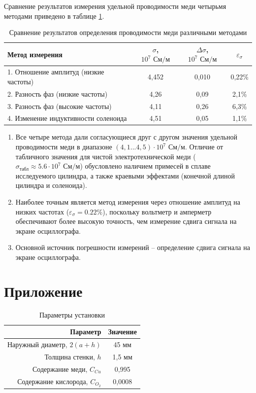 \documentclass[12pt]{extarticle}
\begin{document}
	\hspace{4mm} Сравнение результатов измерения удельной проводимости меди четырьмя методами приведено в таблице \ref{tab:summary}.
	\begin{table}[H]
		\centering
		\caption{Сравнение результатов определения проводимости меди различными методами}
		\label{tab:summary}
		\begin{tabular}{lccc}
			\toprule
			Метод измерения & $\sigma$, $10^7\text{ См/м}$ & $\Delta\sigma$, $10^7\text{ См/м}$ & $\varepsilon_\sigma$ \\
			\midrule
			1. Отношение амплитуд (низкие частоты) & 4,452 & 0,010 & 0,22\% \\
			2. Разность фаз (низкие частоты)       & 4,26  & 0,09  & 2,1\%  \\
			3. Разность фаз (высокие частоты)      & 4,11  & 0,26  & 6,3\%  \\
			4. Изменение индуктивности соленоида   & 4,51  & 0,05  & 1,1\%  \\
			\bottomrule
		\end{tabular}
	\end{table}
	
	\begin{enumerate}
		\item Все четыре метода дали согласующиеся друг с другом значения удельной проводимости меди в диапазоне $(4,1...4,5)\cdot 10^7\text{ См/м}$. Отличие от табличного значения для чистой электротехнической меди ($\sigma_{\text{табл}} \approx 5.6\cdot 10^7\text{ См/м}$) обусловлено наличием примесей в сплаве исследуемого цилиндра, а также краевыми эффектами (конечной длиной цилиндра и соленоида).
		\item Наиболее точным является метод измерения через отношение амплитуд на низких частотах ($\varepsilon_\sigma = 0.22\%$), поскольку вольтметр и амперметр обеспечивают более высокую точность, чем измерение сдвига сигнала на экране осциллографа.
		\item Основной источник погрешности измерений -- определение сдвига сигнала на экране осциллографа.
	\end{enumerate}
	
	
\newpage
\section{Приложение}

	\begin{table}[h!]
		\caption{Параметры установки}
		\centering
		\begin{tabular}{|r|c|}
			\hline
			Параметр & Значение \\
			\hline
			Наружный диаметр, $2(a + h)$ & 45 мм  \\
			Толщина стенки, $h$ & 1,5 мм  \\
			Содержание меди, $C_{Cu}$ &  0,995 \\
			Содержание кислорода, $C_{O_2}$ & 0,0008 \\
			\hline
		\end{tabular}
	\end{table}
	
\end{document}
